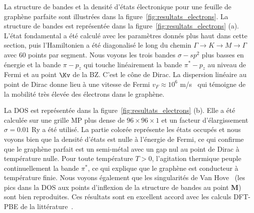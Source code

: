 La structure de bandes et la densité d'états électronique pour une feuille de graphène parfaite sont illustrées dans la figure~\ref{fig:resultats_electrons}. La structure de bandes est représentée dans la figure~\ref{fig:resultats_electrons} (a). L'état fondamental a été calculé avec les paramètres donnés plus haut dans cette section, puis l'Hamiltonien a été diagonalisé le long du chemin $\Gamma\to K\to M\to\Gamma$ avec 60 points par segment. Nous voyons les trois bandes $\sigma-sp^2$ plus basses en énergie et la bande $\pi-p_z$ qui touche linéairement la bande $\pi^*-p_z$ au niveau de Fermi et au point $\Kv$ de la BZ. C'est le cône de Dirac. La dispersion linéaire au point de Dirac donne lieu à une vitesse de Fermi $v_F\approx10^6$ m/s~\cite{castronetoElectronicPropertiesGraphene2009,novoselovTwodimensionalGasMassless2005} qui témoigne de la mobilité très élevée des électrons dans le graphène.

La DOS est représentée dans la figure~\ref{fig:resultats_electrons} (b). Elle a été calculée sur une grille MP plus dense de $96\times96\times1$ et un facteur d'élargissement $\sigma=0.01$ Ry a été utilisé. La partie colorée représente les états occupés et nous voyons bien que la densité d'états est nulle à l'énergie de Fermi, ce qui confirme que le graphène parfait est un semi-métal avec un gap nul au point de Dirac à température nulle. Pour toute température $T>0$, l'agitation thermique peuple continuellement la bande $\pi^*$, ce qui explique que le graphène est conducteur à température finie. Nous voyons également que les singularités de Van Hove~\cite{dresselhausPhysicalPropertiesCarbon1998,BassaniParraviciniElectronic} (les pics dans la DOS aux points d'inflexion de la structure de bandes au point $\mathbf{M}$) sont bien reproduites. Ces résultats sont en excellent accord avec les calculs DFT-PBE de la littérature~\cite{castronetoElectronicPropertiesGraphene2009}.

